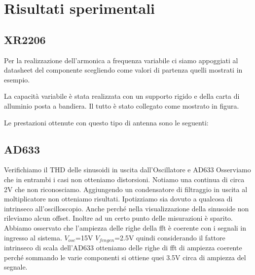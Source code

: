 \documentclass[titlepage]{report}
\begin{document}
\chapter{Risultati sperimentali}

\section{XR2206}
	Per la realizzazione dell'armonica a frequenza variabile ci siamo appoggiati al datasheet del componente scegliendo come valori di partenza quelli mostrati in esempio. 
	
	La capacità variabile è stata realizzata con un supporto rigido e della carta di alluminio posta a bandiera. Il tutto è stato collegato come mostrato in figura.
	
	
	Le prestazioni ottenute con questo tipo di antenna sono le seguenti:
	
	
	
\section{AD633}
	
	
	Verifichiamo il THD delle sinusoidi in uscita dall'Oscillatore e AD633
	Osserviamo che in entrambi i casi non otteniamo distorsioni. Notiamo una continua di circa 2V che non riconosciamo.
	Aggiungendo un condensatore di filtraggio in uscita al moltiplicatore non otteniamo risultati. Ipotizziamo sia dovuto a qualcosa di intrinseco all'oscilloscopio. 
	Anche perché nella visualizzazione della sinusoide non rileviamo alcun offset. Inoltre ad un certo punto delle misurazioni è sparito.
	Abbiamo osservato che l'ampiezza delle righe della fft è coerente con i segnali in ingresso al sistema. $V_{osc}$=15V $V_{fcngen}$=2.5V quindi considerando il fattore intrinseco di scala dell'AD633 otteniamo delle righe di fft di ampiezza coerente perché sommando le varie componenti si ottiene quei 3.5V circa di ampiezza del segnale.
\end{document}
